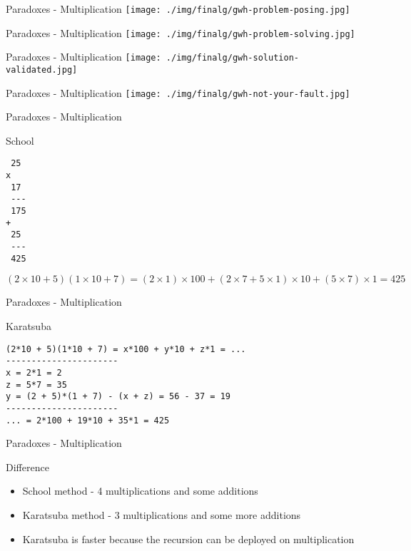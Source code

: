\documentclass[presentation]{beamer}
\begin{document}
\begin{frame}[label=sec-2-10]{Paradoxes - Multiplication}
\texttt{[image: ./img/finalg/gwh-problem-posing.jpg]}
\end{frame}
\begin{frame}[label=sec-2-11]{Paradoxes - Multiplication}
\texttt{[image: ./img/finalg/gwh-problem-solving.jpg]}
\end{frame}
\begin{frame}[label=sec-2-12]{Paradoxes - Multiplication}
\texttt{[image: ./img/finalg/gwh-solution-validated.jpg]}
\end{frame}
\begin{frame}[label=sec-2-13]{Paradoxes - Multiplication}
\texttt{[image: ./img/finalg/gwh-not-your-fault.jpg]}
\end{frame}
\begin{frame}[fragile,label=sec-2-14]{Paradoxes - Multiplication}
 \begin{block}{School}
\begin{verbatim}
 25 
x
 17 
 ---
 175 
+
 25 
 ---
 425
\end{verbatim}
$(2\times10 + 5)(1\times10 + 7) = (2\times1)\times100 + (2\times7 + 5\times1)\times10 + (5\times7)\times1 = 425$
\end{block}
\end{frame}
\begin{frame}[fragile,label=sec-2-15]{Paradoxes - Multiplication}
 \begin{block}{Karatsuba}
\begin{verbatim}
(2*10 + 5)(1*10 + 7) = x*100 + y*10 + z*1 = ...
----------------------
x = 2*1 = 2
z = 5*7 = 35
y = (2 + 5)*(1 + 7) - (x + z) = 56 - 37 = 19
----------------------
... = 2*100 + 19*10 + 35*1 = 425
\end{verbatim}
\end{block}
\end{frame}
\begin{frame}[label=sec-2-16]{Paradoxes - Multiplication}
\begin{block}{Difference}
\begin{itemize}
\item School method - 4 multiplications and some additions
\item Karatsuba method - 3 multiplications and some more additions
\item Karatsuba is faster because the recursion can be deployed on multiplication
\end{itemize}
\end{block}
\end{frame}
\end{document}
